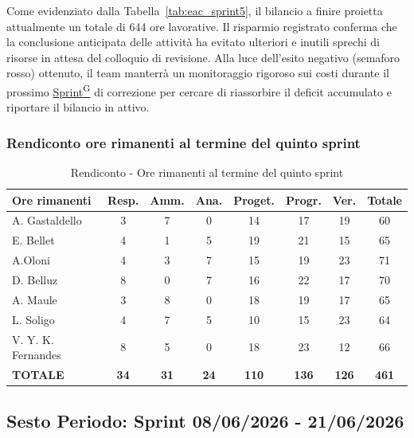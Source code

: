\documentclass[a4paper,12pt]{article}
\providecommand{\glslink}[2]{\href{https://alittlebyte-19.github.io/Documentazione/glossario.html\#gls-#1}{\underline{#2}\textsuperscript{\scriptsize G}}}
\begin{document}
Come evidenziato dalla Tabella~\ref{tab:eac_sprint5}, il bilancio a finire proietta attualmente un totale di 644 ore lavorative. Il risparmio registrato conferma che la conclusione anticipata delle attività ha evitato ulteriori e inutili sprechi di risorse in attesa del colloquio di revisione. Alla luce dell'esito negativo (semaforo rosso) ottenuto, il team manterrà un monitoraggio rigoroso sui costi durante il prossimo \glslink{sprint}{Sprint} di correzione per cercare di riassorbire il deficit accumulato e riportare il bilancio in attivo.

\subsubsection{Rendiconto ore rimanenti al termine del quinto sprint}
\begin{table}[htbp]
\centering
\renewcommand{\arraystretch}{1.5} 
\begin{tabularx}{\textwidth}{|X|c|c|c|c|c|c|c|}
\hline
\textbf{Ore rimanenti} & \textbf{Resp.} & \textbf{Amm.} & \textbf{Ana.} & \textbf{Proget.} & \textbf{Progr.} & \textbf{Ver.} & \textbf{Totale} \\
\hline
A. Gastaldello & 3 & 7 & 0 & 14 & 17 & 19 & 60 \\
\hline
E. Bellet & 4 & 1 & 5 & 19 & 21 & 15 & 65 \\
\hline
A.Oloni & 4 & 3 & 7 & 15 & 19 & 23 & 71 \\
\hline
D. Belluz & 8 & 0 & 7 & 16 & 22 & 17 & 70 \\
\hline
A. Maule & 3 & 8 & 0 & 18 & 19 & 17 & 65 \\
\hline
L. Soligo & 4 & 7 & 5 & 10 & 15 & 23 & 64 \\
\hline
V. Y. K. Fernandes & 8 & 5 & 0 & 18 & 23 & 12 & 66 \\
\hline
\rowcolor{gray!20}
\textbf{TOTALE} & \textbf{34} & \textbf{31} & \textbf{24} & \textbf{110} & \textbf{136} & \textbf{126} & \textbf{461} \\
\hline
\end{tabularx}
\caption{Rendiconto - Ore rimanenti al termine del quinto sprint}
\end{table}


\newpage
\subsection {Sesto Periodo: Sprint 08/06/2026 - 21/06/2026}

\label{sec:pec_sestoperiodo}
\end{document}
